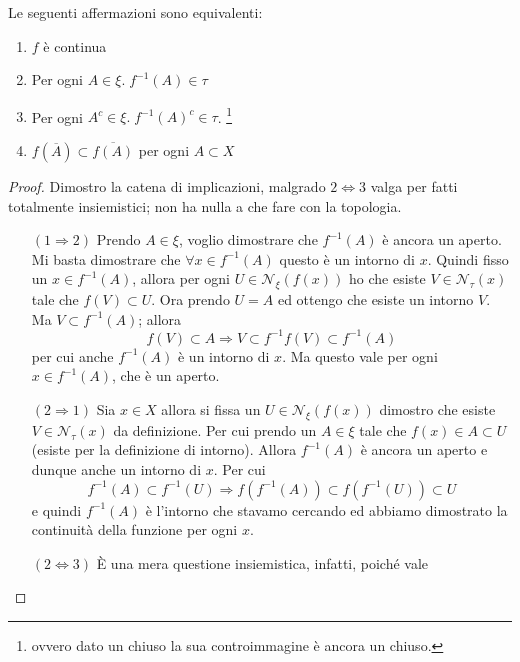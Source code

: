 \begin{theorem}
	Le seguenti affermazioni sono equivalenti:
	\begin{enumerate}
		\item $f$ è continua
		\item Per ogni $A \in \xi  . \; f^{-1}(A) \in \tau$
		\item Per ogni $A^c \in \xi  . \; f^{-1}(A)^c \in \tau$. \footnote{ovvero dato un chiuso la sua controimmagine è ancora un chiuso.}
		\item $f(\overline{A}) \subset \overline{f(A)}$ per ogni $A \subset X$
	\end{enumerate}
\end{theorem}
\begin{proof}
	Dimostro la catena di implicazioni, malgrado $2 \iff 3$ valga per fatti totalmente insiemistici; non ha nulla a che fare con la topologia.
	\begin{enumerate}
		\item[$(1\Rightarrow 2)$] Prendo $A \in \xi$, voglio dimostrare che $f^{-1}(A)$ è ancora un aperto. Mi basta dimostrare che $\forall x \in f^{-1}(A)$ questo è un intorno di $x$. Quindi fisso un $x \in f^{-1}(A)$, allora per ogni $U \in \mathcal{N}_\xi(f(x))$ ho che esiste $V \in \mathcal{N}_\tau(x)$ tale che $f(V) \subset U$. Ora prendo $U = A$ ed ottengo che esiste un intorno $V$. Ma $V \subset f^{-1}(A)$; allora
		\begin{equation*}
			f(V) \subset A \Longrightarrow V \subset f^{-1}f(V) \subset f^{-1}(A)
		\end{equation*}
		per cui anche $f^{-1}(A)$ è un intorno di $x$. Ma questo vale per ogni $x \in f^{-1}(A)$, che è un aperto.
		\item[$(2 \Rightarrow 1)$] Sia $x \in X$ allora si fissa un $U \in \mathcal{N}_\xi(f(x))$ dimostro che esiste $V \in \mathcal{N}_\tau(x)$ da definizione. Per cui prendo un $A \in \xi$ tale che $f(x) \in A \subset U$ (esiste per la definizione di intorno). Allora $f^{-1}(A)$ è ancora un aperto e dunque anche un intorno di $x$. Per cui 
		\begin{equation*}
			f^{-1}(A) \subset f^{-1}(U) \Longrightarrow f(f^{-1}(A)) \subset f(f^{-1}(U)) \subset U
		\end{equation*}
		e quindi $f^{-1}(A)$ è l'intorno che stavamo cercando ed abbiamo dimostrato la continuità della funzione per ogni $x$.
		\item[$(2 \Leftrightarrow 3)$] È una mera questione insiemistica, infatti, poiché vale 
		\begin{equation*}

\end{equation*}
\end{enumerate}
\end{proof}
